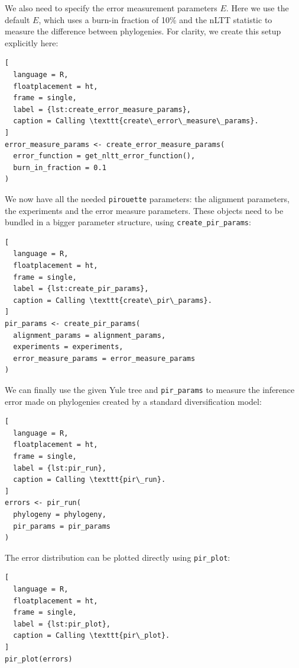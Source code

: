 We also need to specify the error measurement parameters $\mathit{E}$.
Here we use the default $\mathit{E}$, which uses a burn-in fraction of 10\% and the nLTT statistic to
measure the difference between phylogenies. For clarity,
we create this setup explicitly here:

\begin{lstlisting}[
  language = R,
  floatplacement = ht,
  frame = single,
  label = {lst:create_error_measure_params},
  caption = Calling \texttt{create\_error\_measure\_params}.
]
error_measure_params <- create_error_measure_params(
  error_function = get_nltt_error_function(),
  burn_in_fraction = 0.1
)
\end{lstlisting}

We now have all the needed \verb;pirouette; parameters: the alignment parameters, the experiments and the error measure parameters.
These objects need to be bundled in a bigger parameter structure, using \verb;create_pir_params;:

\begin{lstlisting}[
  language = R,
  floatplacement = ht,
  frame = single,
  label = {lst:create_pir_params},
  caption = Calling \texttt{create\_pir\_params}.
]
pir_params <- create_pir_params(
  alignment_params = alignment_params,
  experiments = experiments,
  error_measure_params = error_measure_params
)
\end{lstlisting}

We can finally use the given Yule tree and \verb;pir_params; to measure the inference error made on phylogenies
created by a standard diversification model:

\begin{lstlisting}[
  language = R,
  floatplacement = ht,
  frame = single,
  label = {lst:pir_run},
  caption = Calling \texttt{pir\_run}.
]
errors <- pir_run(
  phylogeny = phylogeny,
  pir_params = pir_params
)
\end{lstlisting}

The error distribution can be plotted directly using \verb;pir_plot;:

\begin{lstlisting}[
  language = R,
  floatplacement = ht,
  frame = single,
  label = {lst:pir_plot},
  caption = Calling \texttt{pir\_plot}.
]
pir_plot(errors)
\end{lstlisting}


